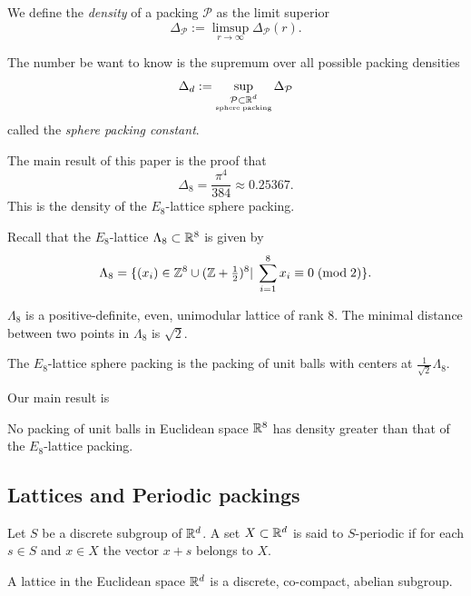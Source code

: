   \begin{definition} We define the \emph{density} of a packing $\mathcal{P}$ as the limit superior
  $$\Delta_{\mathcal{P}}:=\limsup\limits_{r\to\infty}\Delta_{\mathcal{P}}(r). $$
  \end{definition}

  \begin{definition}
  The number be want to know is the supremum over all possible packing densities
  $$\Delta_d:=\sup\limits_{\substack{\mathcal{P}\subset\mathbb{R}^d\\ \scriptscriptstyle\mathrm{sphere}\;\mathrm{packing}}}\Delta_{\mathcal{P}} $$
  called the \emph{sphere packing constant}.
  \end{definition}

  The main result of this paper is the proof that $$\Delta_8=\frac{\pi^4}{384}\approx 0.25367.$$
  This is the density of the $E_8$-lattice sphere packing.
  \begin{definition}Recall that the $E_8$-lattice $\Lambda_8\subset\mathbb{R}^8$ is given by
  $$\Lambda_8=\{(x_i)\in\mathbb{Z}^8\cup(\mathbb{Z}+\textstyle\frac12\displaystyle )^8|\;\sum_{i=1}^8x_i\equiv 0\;(\mathrm{mod\;2})\}.$$
  \end{definition}
  \begin{lemma}$\Lambda_8$ is a positive-definite, even, unimodular lattice of rank 8. The minimal distance between two points in $\Lambda_8$ is $\sqrt{2}$.
  \end{lemma}
  \begin{definition}
  The $E_8$-lattice sphere packing is the packing of unit balls with centers at $\frac{1}{\sqrt{2}}\Lambda_8.$
  \end{definition}
  Our main result is
  \begin{theorem}\label{thm: main}
  No packing of unit balls
  in Euclidean space $\mathbb{R}^8$ has density greater than that of the $E_8$-lattice packing.
  \end{theorem}

  \subsection{Lattices and Periodic packings}
  \begin{definition} Let $S$ be a discrete subgroup of $\mathbb{R}^d$. A set $X\subset\mathbb{R}^d$ is said to $S$-periodic if for each $s\in S$ and $x\in X$ the vector $x+s$ belongs to $X$.
  \end{definition}

  \begin{definition}\label{Lattice.is_Lattice}
    A lattice in the Euclidean space $\mathbb{R}^d$ is a discrete, co-compact, abelian subgroup.
  \end{definition}

